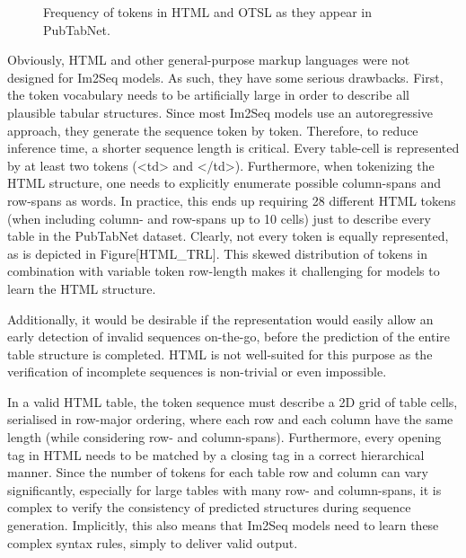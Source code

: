 \documentclass[11pt,a4paper]{article}
\begin{document}
\begin{figure}[h]
\caption{Frequency of tokens in HTML and OTSL as they appear in PubTabNet.}
\end{figure}

Obviously, HTML and other general-purpose markup languages were not designed for Im2Seq models. As such, they have some serious drawbacks. First, the token vocabulary needs to be artificially large in order to describe all plausible tabular structures. Since most Im2Seq models use an autoregressive approach, they generate the sequence token by token. Therefore, to reduce inference time, a shorter sequence length is critical. Every table-cell is represented by at least two tokens (<td> and </td>). Furthermore, when tokenizing the HTML structure, one needs to explicitly enumerate possible column-spans and row-spans as words. In practice, this ends up requiring 28 different HTML tokens (when including column- and row-spans up to 10 cells) just to describe every table in the PubTabNet dataset. Clearly, not every token is equally represented, as is depicted in Figure[HTML\_TRL]. This skewed distribution of tokens in combination with variable token row-length makes it challenging for models to learn the HTML structure.

Additionally, it would be desirable if the representation would easily allow an early detection of invalid sequences on-the-go, before the prediction of the entire table structure is completed. HTML is not well-suited for this purpose as the verification of incomplete sequences is non-trivial or even impossible.

In a valid HTML table, the token sequence must describe a 2D grid of table cells, serialised in row-major ordering, where each row and each column have the same length (while considering row- and column-spans). Furthermore, every opening tag in HTML needs to be matched by a closing tag in a correct hierarchical manner. Since the number of tokens for each table row and column can vary significantly, especially for large tables with many row- and column-spans, it is complex to verify the consistency of predicted structures during sequence generation. Implicitly, this also means that Im2Seq models need to learn these complex syntax rules, simply to deliver valid output.
\end{document}

